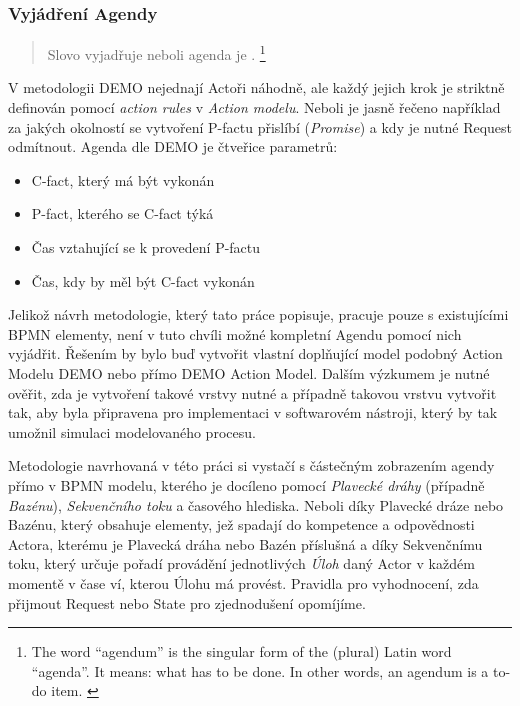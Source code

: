 \documentclass[]{article}
\begin{document}
\subsubsection{Vyjádření Agendy}

\begin{quote}
Slovo  vyjadřuje  neboli agenda je . \cite{Dietz2006}
\footnote{The word “agendum” is the singular form of the (plural) Latin word “agenda”. It means: what has to be done. In other words, an agendum is a to-do item. \cite{Dietz2006}}
\end{quote}

V metodologii DEMO nejednají Actoři náhodně, ale každý jejich krok je striktně definován pomocí \textit{action rules} v \textit{Action modelu}. Neboli je jasně řečeno například za jakých okolností se vytvoření P-factu přislíbí (\textit{Promise}) a kdy je nutné Request odmítnout. Agenda dle DEMO je čtveřice parametrů:

\begin{itemize}
\item C-fact, který má být vykonán
\item P-fact, kterého se C-fact týká
\item Čas vztahující se k provedení P-factu
\item Čas, kdy by měl být C-fact vykonán %
\end{itemize}

Jelikož návrh metodologie, který tato práce popisuje, pracuje pouze s existujícími BPMN elementy, není v tuto chvíli možné kompletní Agendu pomocí nich vyjádřit. Řešením by bylo buď vytvořit vlastní doplňující model podobný Action Modelu DEMO nebo přímo DEMO Action Model. Dalším výzkumem je nutné ověřit, zda je vytvoření takové vrstvy nutné a případně takovou vrstvu vytvořit tak, aby byla připravena pro implementaci v softwarovém nástroji, který by tak umožnil simulaci modelovaného procesu.

Metodologie navrhovaná v této práci si vystačí s částečným zobrazením agendy přímo v BPMN modelu, kterého je docíleno pomocí \textit{Plavecké dráhy} (případně \textit{Bazénu}), \textit{Sekvenčního toku} a časového hlediska. Neboli díky Plavecké dráze nebo Bazénu, který obsahuje elementy, jež spadají do kompetence a odpovědnosti Actora, kterému je Plavecká dráha nebo Bazén příslušná a díky Sekvenčnímu toku, který určuje pořadí provádění jednotlivých \textit{Úloh} daný Actor v každém momentě v čase ví, kterou Úlohu má provést. Pravidla pro vyhodnocení, zda přijmout Request nebo State pro zjednodušení opomíjíme.
\end{document}
